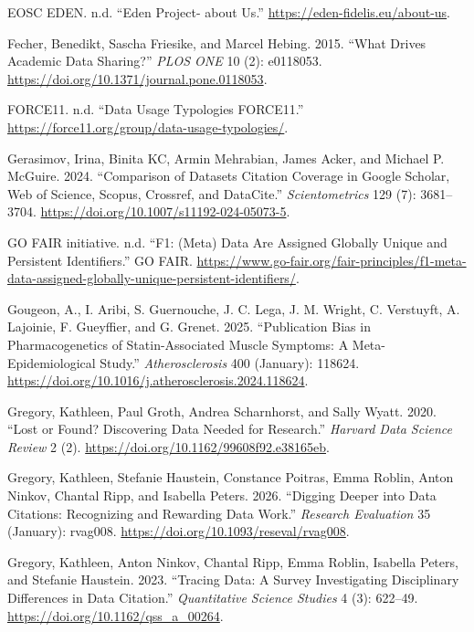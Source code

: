 \documentclass[
  letterpaper,
  DIV=11,
  numbers=noendperiod]{scrartcl}
\newlength{\cslhangindent}
\newenvironment{CSLReferences}[2] %
 {\begin{list}{}{%
  \setlength{\itemindent}{0pt}
  \setlength{\leftmargin}{0pt}
  \setlength{\parsep}{0pt}
  \ifodd #1
   \setlength{\leftmargin}{\cslhangindent}
   \setlength{\itemindent}{-1\cslhangindent}
  \fi
  \setlength{\itemsep}{#2\baselineskip}}}
 {\end{list}}
\begin{document}
\begin{CSLReferences}{1}{0}
EOSC EDEN. n.d. {``Eden Project- about Us.''}
\url{https://eden-fidelis.eu/about-us}.

Fecher, Benedikt, Sascha Friesike, and Marcel Hebing. 2015. {``What
{Drives Academic Data Sharing}?''} \emph{PLOS ONE} 10 (2): e0118053.
\url{https://doi.org/10.1371/journal.pone.0118053}.

FORCE11. n.d. {``Data Usage Typologies {\textendash} FORCE11.''}
\url{https://force11.org/group/data-usage-typologies/}.

Gerasimov, Irina, Binita KC, Armin Mehrabian, James Acker, and Michael
P. McGuire. 2024. {``Comparison of Datasets Citation Coverage in Google
Scholar, Web of Science, Scopus, Crossref, and DataCite.''}
\emph{Scientometrics} 129 (7): 3681--3704.
\url{https://doi.org/10.1007/s11192-024-05073-5}.

GO FAIR initiative. n.d. {``F1: ({Meta}) Data Are Assigned Globally
Unique and Persistent Identifiers.''} GO FAIR.
\url{https://www.go-fair.org/fair-principles/f1-meta-data-assigned-globally-unique-persistent-identifiers/}.

Gougeon, A., I. Aribi, S. Guernouche, J. C. Lega, J. M. Wright, C.
Verstuyft, A. Lajoinie, F. Gueyffier, and G. Grenet. 2025.
{``Publication Bias in Pharmacogenetics of Statin-Associated Muscle
Symptoms: {A} Meta-Epidemiological Study.''} \emph{Atherosclerosis} 400
(January): 118624.
\url{https://doi.org/10.1016/j.atherosclerosis.2024.118624}.

Gregory, Kathleen, Paul Groth, Andrea Scharnhorst, and Sally Wyatt.
2020. {``Lost or Found? Discovering Data Needed for Research.''}
\emph{Harvard Data Science Review} 2 (2).
\url{https://doi.org/10.1162/99608f92.e38165eb}.

Gregory, Kathleen, Stefanie Haustein, Constance Poitras, Emma Roblin,
Anton Ninkov, Chantal Ripp, and Isabella Peters. 2026. {``Digging Deeper
into Data Citations: Recognizing and Rewarding Data Work.''}
\emph{Research Evaluation} 35 (January): rvag008.
\url{https://doi.org/10.1093/reseval/rvag008}.

Gregory, Kathleen, Anton Ninkov, Chantal Ripp, Emma Roblin, Isabella
Peters, and Stefanie Haustein. 2023. {``Tracing Data: A Survey
Investigating Disciplinary Differences in Data Citation.''}
\emph{Quantitative Science Studies} 4 (3): 622--49.
\url{https://doi.org/10.1162/qss_a_00264}.


\end{CSLReferences}
\end{document}
